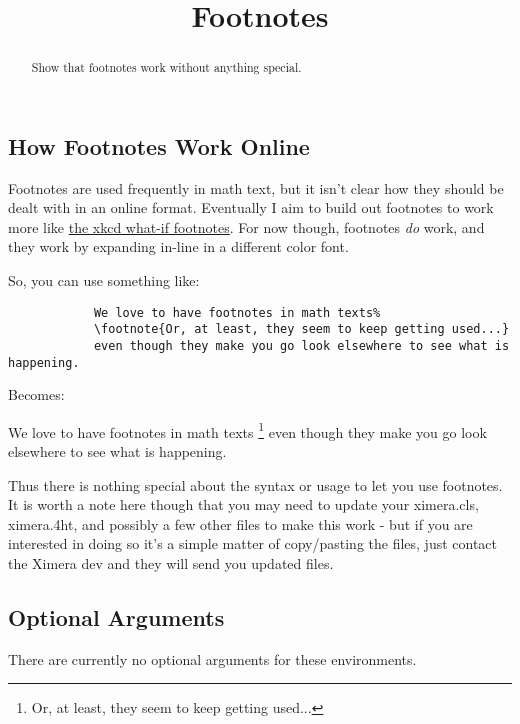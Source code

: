 \documentclass{ximera}
\title{Footnotes}
\begin{document}
\begin{abstract}
    Show that footnotes work without anything special.
\end{abstract}
\maketitle

    \subsection*{How Footnotes Work Online}
        Footnotes are used frequently in math text, but it isn't clear how they should be dealt with in an online format. Eventually I aim to build out footnotes to work more like \href{https://what-if.xkcd.com/}{the xkcd what-if footnotes}. For now though, footnotes \textit{do} work, and they work by expanding in-line in a different color font.
        
        So, you can use something like:
        
        \begin{verbatim}
            We love to have footnotes in math texts%
            \footnote{Or, at least, they seem to keep getting used...}
            even though they make you go look elsewhere to see what is happening.
        \end{verbatim}
        
        Becomes:
        
        We love to have footnotes in math texts%
        \footnote{Or, at least, they seem to keep getting used...}
        even though they make you go look elsewhere to see what is happening.
        
        Thus there is nothing special about the syntax or usage to let you use footnotes. It is worth a note here though that you may need to update your ximera.cls, ximera.4ht, and possibly a few other files to make this work - but if you are interested in doing so it's a simple matter of copy/pasting the files, just contact the Ximera dev and they will send you updated files.


        
    \subsection*{Optional Arguments}
        There are currently no optional arguments for these environments.
\end{document}
